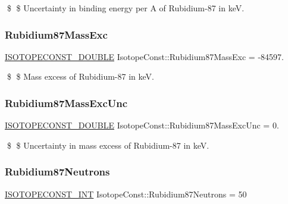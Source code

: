 \$ \$ Uncertainty in binding energy per A of Rubidium-\/87 in keV. \mbox{\label{group___isotope_const-_rubidium-_rb87_ga9cfc37c8b48860c713b1f2e2a5c97f90}} 
\subsubsection{\texorpdfstring{Rubidium87\+Mass\+Exc}{Rubidium87MassExc}}
{\footnotesize\ttfamily \mbox{\hyperlink{group___isotope_const-_macros_ga8f45a7272ce02c0b4c65c44636ed719a}{I\+S\+O\+T\+O\+P\+E\+C\+O\+N\+S\+T\+\_\+\+D\+O\+U\+B\+LE}} Isotope\+Const\+::\+Rubidium87\+Mass\+Exc = -\/84597.}

\$ \$ Mass excess of Rubidium-\/87 in keV. \mbox{\label{group___isotope_const-_rubidium-_rb87_gad54faf75fb7e1f6d36272c9c3148a941}} 
\subsubsection{\texorpdfstring{Rubidium87\+Mass\+Exc\+Unc}{Rubidium87MassExcUnc}}
{\footnotesize\ttfamily \mbox{\hyperlink{group___isotope_const-_macros_ga8f45a7272ce02c0b4c65c44636ed719a}{I\+S\+O\+T\+O\+P\+E\+C\+O\+N\+S\+T\+\_\+\+D\+O\+U\+B\+LE}} Isotope\+Const\+::\+Rubidium87\+Mass\+Exc\+Unc = 0.}

\$ \$ Uncertainty in mass excess of Rubidium-\/87 in keV. \mbox{\label{group___isotope_const-_rubidium-_rb87_ga87d96eb462733ef8627a3fe7bbe88de8}} 
\subsubsection{\texorpdfstring{Rubidium87\+Neutrons}{Rubidium87Neutrons}}
{\footnotesize\ttfamily \mbox{\hyperlink{group___isotope_const-_macros_ga5f18360b3e99483a35c32d789e62621c}{I\+S\+O\+T\+O\+P\+E\+C\+O\+N\+S\+T\+\_\+\+I\+NT}} Isotope\+Const\+::\+Rubidium87\+Neutrons = 50}

